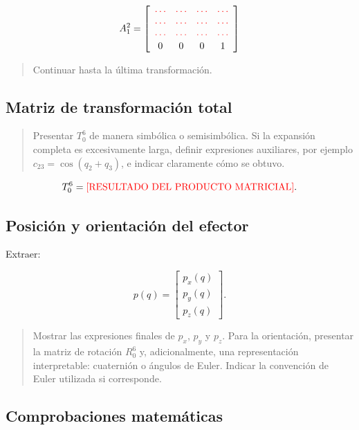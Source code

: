 \documentclass[journal]{IEEEtran}
\newcommand{\instr}[1]{%
\begin{quote}
\small
\noindent\textbf{\color{blue}{INSTRUCCIÓN:}} #1
\end{quote}
}
\begin{document}
\begin{equation}
A_1^2 =
\left[\begin{array}{cccc}
\color{red}\cdots & \color{red}\cdots & \color{red}\cdots & \color{red}\cdots\\
\color{red}\cdots & \color{red}\cdots & \color{red}\cdots & \color{red}\cdots\\
\color{red}\cdots & \color{red}\cdots & \color{red}\cdots & \color{red}\cdots\\
0 & 0 & 0 & 1
\end{array}\right]
\end{equation}

\instr{Continuar hasta la última transformación.}

\subsection{Matriz de transformación total}

\instr{Presentar $T_0^6$ de manera simbólica o semisimbólica. Si la expansión completa es excesivamente larga, definir expresiones auxiliares, por ejemplo $c_{23}=\cos(q_2+q_3)$, e indicar claramente cómo se obtuvo.}

\begin{equation}
T_0^6 =
\textcolor{red}{\text{[RESULTADO DEL PRODUCTO MATRICIAL]}}.
\end{equation}

\subsection{Posición y orientación del efector}

Extraer:

\begin{equation}
p(q) =
\begin{bmatrix}
p_x(q)\\
p_y(q)\\
p_z(q)
\end{bmatrix}.
\end{equation}

\instr{Mostrar las expresiones finales de $p_x$, $p_y$ y $p_z$. Para la orientación, presentar la matriz de rotación $R_0^6$ y, adicionalmente, una representación interpretable: cuaternión o ángulos de Euler. Indicar la convención de Euler utilizada si corresponde.}

\subsection{Comprobaciones matemáticas}
\end{document}
